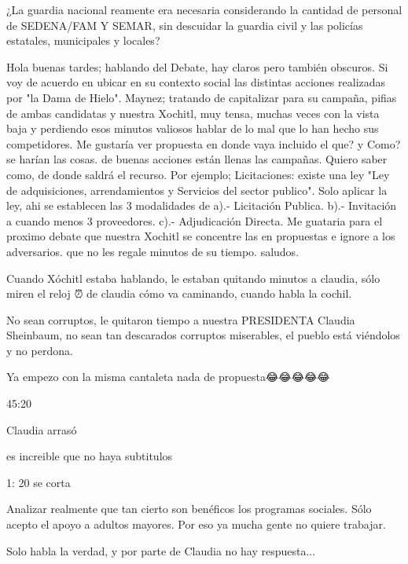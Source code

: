 ¿La guardia nacional reamente era necesaria considerando la cantidad de personal de SEDENA/FAM Y SEMAR, sin descuidar la guardia civil y las policías estatales, municipales y locales?

Hola buenas tardes; hablando del Debate, hay claros pero también obscuros. Si voy de acuerdo en ubicar en su contexto social las distintas acciones realizadas por "la Dama de Hielo". Maynez; tratando de capitalizar para su campaña, pifias de ambas candidatas y nuestra Xochitl, muy tensa, muchas veces con la vista baja y perdiendo esos minutos valiosos hablar de lo mal que lo han hecho sus competidores. Me gustaría ver propuesta en donde vaya incluido el que? y Como? se harían las cosas. de buenas acciones están llenas las campañas. Quiero saber como, de donde saldrá el recurso. Por ejemplo;  Licitaciones: existe una ley "Ley de adquisiciones, arrendamientos  y Servicios del sector publico". Solo aplicar la ley, ahi se establecen las 3 modalidades de a).- Licitación Publica. b).- Invitación a cuando menos 3 proveedores. c).- Adjudicación Directa. Me guataria para el proximo debate que nuestra Xochitl se concentre las en propuestas e ignore a los adversarios. que no les regale minutos de su tiempo. saludos.

Cuando Xóchitl estaba hablando, le estaban quitando minutos a claudia, sólo miren el reloj ⏰ de claudia cómo va caminando, cuando habla la cochil.

No sean corruptos, le quitaron tiempo a nuestra PRESIDENTA Claudia Sheinbaum, no sean tan descarados corruptos miserables, el pueblo está viéndolos y no perdona.

Ya empezo con la misma cantaleta nada de propuesta😂😂😂😂😂

45:20

Claudia arrasó 👏

es increible que no haya subtitulos

1: 20 se corta

Analizar realmente que tan cierto  son benéficos los programas sociales. Sólo acepto el apoyo a adultos mayores. Por eso ya mucha gente no quiere trabajar.

Solo habla la verdad, y por parte de Claudia no hay respuesta...

